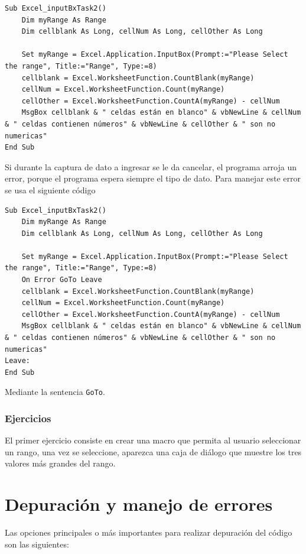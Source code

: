  
\begin{verbatim}
Sub Excel_inputBxTask2()
    Dim myRange As Range
    Dim cellblank As Long, cellNum As Long, cellOther As Long
    
    Set myRange = Excel.Application.InputBox(Prompt:="Please Select the range", Title:="Range", Type:=8)
    cellblank = Excel.WorksheetFunction.CountBlank(myRange)
    cellNum = Excel.WorksheetFunction.Count(myRange)
    cellOther = Excel.WorksheetFunction.CountA(myRange) - cellNum
    MsgBox cellblank & " celdas están en blanco" & vbNewLine & cellNum & " celdas contienen números" & vbNewLine & cellOther & " son no numericas"
End Sub
\end{verbatim}

Si durante la captura de dato a ingresar se le da cancelar, el programa arroja un error, porque el programa espera siempre el tipo de dato. Para manejar este error se usa el siguiente código

\begin{verbatim}
Sub Excel_inputBxTask2()
    Dim myRange As Range
    Dim cellblank As Long, cellNum As Long, cellOther As Long
    
    Set myRange = Excel.Application.InputBox(Prompt:="Please Select the range", Title:="Range", Type:=8)
    On Error GoTo Leave
    cellblank = Excel.WorksheetFunction.CountBlank(myRange)
    cellNum = Excel.WorksheetFunction.Count(myRange)
    cellOther = Excel.WorksheetFunction.CountA(myRange) - cellNum
    MsgBox cellblank & " celdas están en blanco" & vbNewLine & cellNum & " celdas contienen números" & vbNewLine & cellOther & " son no numericas"
Leave:
End Sub
\end{verbatim}

Mediante la sentencia \texttt{GoTo}.


\subsubsection{Ejercicios}

El primer ejercicio consiste en crear una macro que permita al usuario seleccionar un rango, una vez se seleccione, aparezca una caja de diálogo que muestre los tres valores más grandes del rango.

\section{Depuración y manejo de errores}


Las opciones principales o más importantes para realizar depuración del código son las siguientes:


